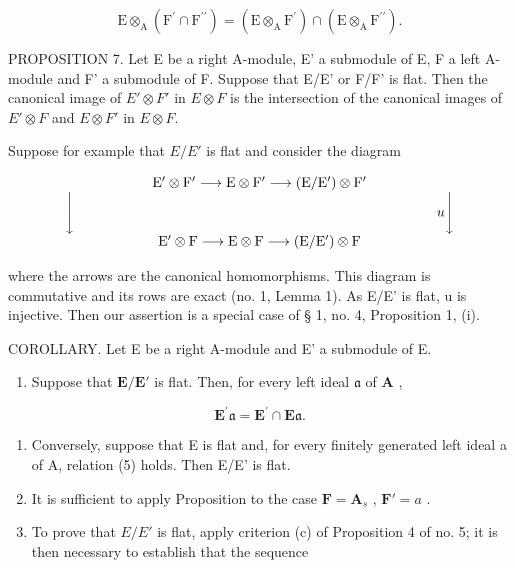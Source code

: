 \[
\mathrm{E} \otimes_ {\mathrm{A}} (\mathrm{F} ^ {\prime} \cap \mathrm{F} ^ {\prime \prime}) = (\mathrm{E} \otimes_ {\mathrm{A}} \mathrm{F} ^ {\prime}) \cap (\mathrm{E} \otimes_ {\mathrm{A}} \mathrm{F} ^ {\prime \prime}).
\]

PROPOSITION 7. Let E be a right A-module, E' a submodule of E, F a left A-module and F' a submodule of F. Suppose that E/E' or F/F' is flat. Then the canonical image of \(E' \otimes F'\) in \(E \otimes F\) is the intersection of the canonical images of \(E' \otimes F\) and \(E \otimes F'\) in \(E \otimes F\).

Suppose for example that \(E/E'\) is flat and consider the diagram

\[
\begin{array}{c} \mathrm{E} ^ {\prime} \otimes \mathrm{F} ^ {\prime} \longrightarrow \mathrm{E} \otimes \mathrm{F} ^ {\prime} \longrightarrow (\mathrm{E} / \mathrm{E} ^ {\prime}) \otimes \mathrm{F} ^ {\prime} \\ \Biggl \downarrow \qquad \qquad \qquad \qquad \qquad \qquad \qquad \qquad \qquad \qquad \qquad \qquad \qquad u \Biggl \downarrow \\ \mathrm{E} ^ {\prime} \otimes \mathrm{F} \longrightarrow \mathrm{E} \otimes \mathrm{F} \longrightarrow (\mathrm{E} / \mathrm{E} ^ {\prime}) \otimes \mathrm{F} \end{array}
\]

where the arrows are the canonical homomorphisms. This diagram is commutative and its rows are exact (no. 1, Lemma 1). As E/E' is flat, u is injective. Then our assertion is a special case of § 1, no. 4, Proposition 1, (i).

COROLLARY. Let E be a right A-module and E' a submodule of E.

\begin{enumerate}
\def\labelenumi{(\roman{enumi})}
\tightlist
\item
  Suppose that \(\mathbf{E} / \mathbf{E}'\) is flat. Then, for every left ideal \(\mathfrak{a}\) of \(\mathbf{A}\) ,
\end{enumerate}

\[
\mathbf {E} ^ {\prime} \mathfrak {a} = \mathbf {E} ^ {\prime} \cap \mathbf {E} \mathfrak {a}.\tag{5}
\]

\begin{enumerate}
\def\labelenumi{(\roman{enumi})}
\setcounter{enumi}{1}
\item
  Conversely, suppose that E is flat and, for every finitely generated left ideal a of A, relation (5) holds. Then E/E' is flat.
\item
  It is sufficient to apply Proposition to the case \(\mathbf{F} = \mathbf{A}_s\) , \(\mathbf{F}' = a\) .
\item
  To prove that \(E/E'\) is flat, apply criterion (c) of Proposition 4 of no. 5; it is then necessary to establish that the sequence
\end{enumerate}

